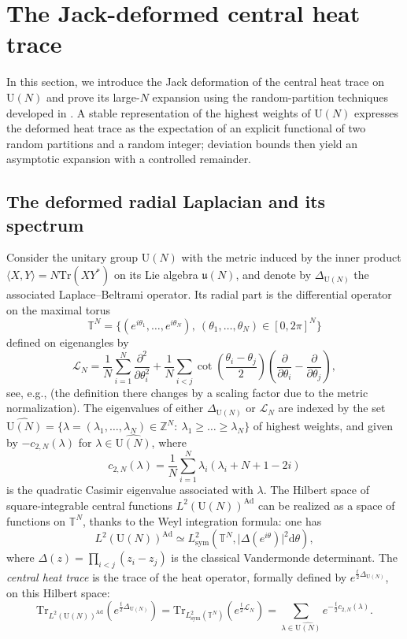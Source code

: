 \documentclass[11pt,a4paper,reqno]{article}
\theoremstyle{definition}
\theoremstyle{remark}
\newcommand\U{{\mathrm U}}
\newcommand\Z{{\mathbb Z}}
\newcommand\Tr{{\mathrm{Tr}}}
\begin{document}
\section{The Jack-deformed central heat trace}\label{sec:jack-heat-trace}

In this section, we introduce the Jack deformation of the central heat trace on $\U(N)$ and prove its large-$N$ expansion using the random-partition techniques developed in \cite{LemMai25,LM2}.  A stable representation of the highest weights of $\U(N)$ expresses the deformed heat trace as the expectation of an explicit functional of two random partitions and a random integer; deviation bounds then yield an asymptotic expansion with a controlled remainder.

\subsection{The deformed radial Laplacian and its spectrum}\label{subsec:radial-spectrum}

Consider the unitary group $\U(N)$ with the metric induced by the inner product $\langle X,Y\rangle=N\Tr(XY^*)$ on its Lie algebra $\mathfrak u(N)$, and denote by $\Delta_{\U(N)}$ the associated Laplace--Beltrami operator. Its radial part is the differential operator on the maximal torus
\[
\mathbb T^N=\{(e^{i\theta_1},\ldots,e^{i\theta_N}),\ (\theta_1,\ldots,\theta_N)\in[0,2\pi]^N\}
\]
defined on eigenangles by
\[
\mathscr L_N=\frac1N\sum_{i=1}^N\frac{\partial^2}{\partial\theta_i^2}+\frac1N\sum_{i<j}\cot\left(\frac{\theta_i-\theta_j}{2}\right)\left(\frac{\partial}{\partial \theta_i}-\frac{\partial}{\partial \theta_j}\right),
\]
see, e.g., \cite[Prop.~12.5.1]{Far08} (the definition there changes by a scaling factor due to the metric normalization). The eigenvalues of either $\Delta_{\U(N)}$ or $\mathscr L_N$ are indexed by the set $\widehat{\U(N)}=\{\lambda=(\lambda_1,\ldots,\lambda_N)\in\Z^N:\ \lambda_1\geq\ldots\geq\lambda_N\}$ of highest weights, and given by $-c_{2,N}(\lambda)$ for $\lambda\in\widehat{\U(N)}$, where
\[
c_{2,N}(\lambda)=\frac{1}{N}\sum_{i=1}^N\lambda_i(\lambda_i+N+1-2i)
\]
is the quadratic Casimir eigenvalue associated with $\lambda$. The Hilbert space of square-integrable central functions $L^2(\U(N))^{\mathrm{Ad}}$ can be realized as a space of functions on $\mathbb T^N$, thanks to the Weyl integration formula: one has
\[
L^2(\U(N))^{\mathrm{Ad}}\simeq L^2_{\mathrm{sym}}(\mathbb T^N,\vert\Delta(e^{i\theta})\vert^2\mathrm d\theta),
\]
where $\Delta(z)=\prod_{i<j}(z_i-z_j)$ is the classical Vandermonde determinant. The \emph{central heat trace} is the trace of the heat operator, formally defined by $e^{\frac{t}{2}\Delta_{\U(N)}}$, on this Hilbert space:
\begin{equation}\label{eq:deformed-radial-Laplacian}
\Tr_{L^2(\U(N))^{\mathrm{Ad}}}(e^{\frac{t}{2}\Delta_{\U(N)}})=\Tr_{L^2_{\mathrm{sym}}(\mathbb T^N)}(e^{\frac{t}{2}\mathscr L_N})=\sum_{\lambda\in\widehat{\U(N)}}e^{-\frac{t}{2}c_{2,N}(\lambda)}.
\end{equation}
\end{document}
